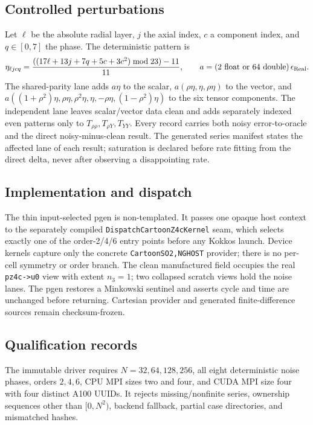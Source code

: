 \subsection{Controlled perturbations}
Let $\ell$ be the absolute radial layer, $j$ the axial index, $c$ a component
index, and $q\in[0,7]$ the phase.  The deterministic pattern is
\[
 \eta_{\ell jcq}={((17\ell+13j+7q+5c+3c^2)\bmod23)-11\over11},
 \qquad a=(2\ \hbox{float or }64\ \hbox{double})\,\epsilon_{\rm Real}.
\]
The shared-parity lane adds $a\eta$ to the scalar,
$a(\rho\eta,\eta,\rho\eta)$ to the vector, and
$a((1+\rho^2)\eta,\rho\eta,\rho^2\eta,\eta,-\rho\eta,
(1-\rho^2)\eta)$ to the six tensor components.  The independent lane leaves
scalar/vector data clean and adds separately indexed even patterns only to
$T_{\rho\rho},T_{\rho Y},T_{YY}$.  Every record carries both noisy error-to-oracle
and the direct noisy-minus-clean result.  The generated series manifest states the
affected lane of each result; saturation is declared before rate fitting from the
direct delta, never after observing a disappointing rate.

\subsection{Implementation and dispatch}
The thin input-selected pgen is non-templated.  It passes one opaque host context to
the separately compiled \texttt{DispatchCartoonZ4cKernel} seam, which selects exactly
one of the order-2/4/6 entry points before any Kokkos launch.  Device kernels capture
only the concrete \texttt{CartoonSO2,NGHOST} provider; there is no per-cell symmetry
or order branch.  The clean manufactured field occupies the real
\texttt{pz4c->u0} view with extent $n_3=1$; two collapsed scratch views hold the
noise lanes.  The pgen restores a Minkowski sentinel and asserts cycle and time are
unchanged before returning.  Cartesian provider and generated finite-difference
sources remain checksum-frozen.

\subsection{Qualification records}
The immutable driver requires $N=32,64,128,256$, all eight deterministic noise
phases, orders $2,4,6$, CPU MPI sizes two and four, and CUDA MPI size four with four
distinct A100 UUIDs.  It rejects missing/nonfinite series, ownership sequences other
than $[0,N^2)$, backend fallback, partial case directories, and mismatched hashes.

